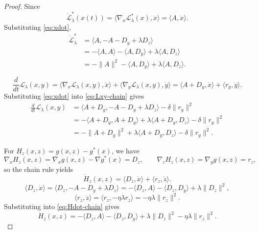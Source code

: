 \documentclass{article}
\newcommand{\1}{\mathbf{1}}
\begin{document}
\begin{proof}
\medskip
\noindent Since 
\[
\dot{\mathcal L}_\lambda^{*}(x(t))=\big\langle\nabla_x\mathcal L_\lambda^{*}(x),\dot x\big\rangle
=\langle A,\dot x\rangle.
\]
Substituting \eqref{eq:xdot},
\begin{align}
\dot{\mathcal L}_\lambda^{*}
&=\langle A,-A-D_y+\lambda D_z\rangle
\nonumber\\
&=-\langle A,A\rangle-\langle A,D_y\rangle+\lambda\langle A,D_z\rangle
\nonumber\\
&=-\|A\|^{2}-\langle A,D_y\rangle+\lambda\langle A,D_z\rangle.
\label{eq:Lstar-dot}
\end{align}

\begin{equation}\label{eq:Lxy-chain}
\frac{d}{dt}\mathcal L_\lambda(x,y)
=\big\langle\nabla_x \mathcal L_\lambda(x,y),\dot x\big\rangle
+\big\langle\nabla_y \mathcal L_\lambda(x,y),\dot y\big\rangle
=\langle A+D_y,\dot x\rangle+\langle r_y,\dot y\rangle.
\end{equation}
Substituting \eqref{eq:xdot} into \eqref{eq:Lxy-chain} gives
\begin{align}
\frac{d}{dt}\mathcal L_\lambda(x,y)
&=\langle A+D_y,-A-D_y+\lambda D_z\rangle-\delta\|r_y\|^{2}
\nonumber\\
&=-\langle A+D_y,A+D_y\rangle+\lambda\langle A+D_y,D_z\rangle-\delta\|r_y\|^{2}
\nonumber\\
&=-\|A+D_y\|^{2}+\lambda\langle A+D_y,D_z\rangle-\delta\|r_y\|^{2}.
\label{eq:Lxy-dot}
\end{align}

\medskip
\noindent For $H_z(x,z)=g(x,z)-g^{*}(x)$, we have
\[
\nabla_x H_z(x,z)=\nabla_x g(x,z)-\nabla g^{*}(x)=D_z,
\qquad
\nabla_z H_z(x,z)=\nabla_y g(x,z)=r_z,
\]
so the chain rule yields
\begin{equation}\label{eq:Hdot-chain}
\dot H_z(x,z)=\langle D_z,\dot x\rangle+\langle r_z,\dot z\rangle.
\end{equation}
\[
\langle D_z,\dot x\rangle
=\langle D_z,-A-D_y+\lambda D_z\rangle
=-\langle D_z,A\rangle-\langle D_z,D_y\rangle+\lambda\|D_z\|^{2},
\]
\[
\langle r_z,\dot z\rangle=\langle r_z,-\eta\lambda r_z\rangle=-\eta\lambda\|r_z\|^{2}.
\]
Substituting into \eqref{eq:Hdot-chain} gives
\begin{equation}\label{eq:Hdot-z}
\dot H_z(x,z)
=-\langle D_z,A\rangle-\langle D_z,D_y\rangle+\lambda\|D_z\|^{2}-\eta\lambda\|r_z\|^{2}.
\end{equation}


\end{proof}
\end{document}
